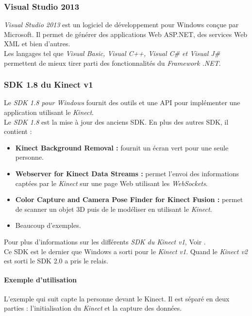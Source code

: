\subsubsection{Visual Studio 2013}
\textit{Visual Studio 2013} est un logiciel de développement pour Windows conçue par Microsoft. Il permet de générer des applications Web ASP.NET, des services Web XML et bien d'autres. \\
Les langages tel que \textit{Visual Basic, Visual C++, Visual C\# et Visual J\#} permettent de mieux tirer parti des fonctionnalités du \textit{Framework .NET}.


\subsubsection{SDK 1.8 du Kinect v1}
Le \textit{SDK 1.8 pour Windows} fournit des outils et une API pour implémenter une application utilisant le \textit{Kinect}. \\

Le \textit{SDK 1.8} est la mise à jour des anciens SDK. En plus des autres SDK, il contient :
\begin{itemize}
	\item \textbf{Kinect Background Removal :} fournit un écran vert pour une seule personne.
	\item \textbf{Webserver for Kinect Data Streams : }permet l'envoi des informations captées par le \textit{Kinect} sur une page Web utilisant les \textit{WebSockets}.
	\item \textbf{Color Capture and Camera Pose Finder for Kinect Fusion :} permet de scanner un objet 3D puis de le modéliser en utilisant le \textit{Kinect}.
	\item Beaucoup d'exemples.
\end{itemize}
Pour plus d'informations sur les différents \textit{SDK du Kinect v1}, Voir \cite{SDKKinectv1}.  \\

Ce SDK est le dernier que Windows a sorti pour le \textit{Kinect v1}. Quand le \textit{Kinect v2} est sorti le SDK 2.0 a pris le relais. \\

\pagebreak
\paragraph{Exemple d'utilisation \\ }
L'exemple qui suit capte la personne devant le Kinect. Il est séparé en deux parties : l'initialisation du \textit{Kinect} et la capture des données.

